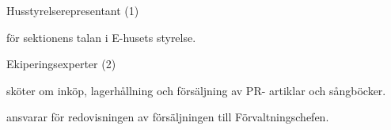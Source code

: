 \documentclass[10pt]{article}
\begin{document}
\begin{emptylist}
\begin{dashlist}
        \end{dashlist}
    \item Husstyrelserepresentant (1)
        \begin{dashlist}
            \item för sektionens talan i E-husets styrelse.
        \end{dashlist}
    \item Ekiperingsexperter (2)
        \begin{dashlist}
            \item sköter om inköp, lagerhållning och försäljning av PR- artiklar och sångböcker.
            \item ansvarar för redovisningen av försäljningen till Förvaltningschefen.
        \end{dashlist}
\end{emptylist}
\end{document}
